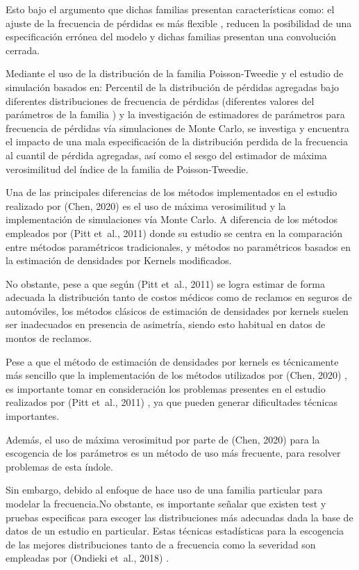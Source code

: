 \documentclass[
  letterpaper,
  onepage,
  openany]{scrreprt}
\begin{document}
Esto bajo el argumento que dichas familias presentan características
como: el ajuste de la frecuencia de pérdidas es más flexible , reducen
la posibilidad de una especificación errónea del modelo y dichas
familias presentan una convolución cerrada.

Mediante el uso de la distribución de la familia Poisson-Tweedie y el
estudio de simulación basados en: Percentil de la distribución de
pérdidas agregadas bajo diferentes distribuciones de frecuencia de
pérdidas (diferentes valores del parámetros de la familia ) y la
investigación de estimadores de parámetros para frecuencia de pérdidas
vía simulaciones de Monte Carlo, se investiga y encuentra el impacto de
una mala especificación de la distribución perdida de la frecuencia al
cuantil de pérdida agregadas, así como el sesgo del estimador de máxima
verosimilitud del índice de la familia de Poisson-Tweedie.

Una de las principales diferencias de los métodos implementados en el
estudio realizado por (Chen, 2020) es el uso de máxima verosimilitud y
la implementación de simulaciones vía Monte Carlo. A diferencia de los
métodos empleados por (Pitt et~al., 2011) donde su estudio se centra en
la comparación entre métodos paramétricos tradicionales, y métodos no
paramétricos basados en la estimación de densidades por Kernels
modificados.

No obstante, pese a que según (Pitt et~al., 2011) se logra estimar de
forma adecuada la distribución tanto de costos médicos como de reclamos
en seguros de automóviles, los métodos clásicos de estimación de
densidades por kernels suelen ser inadecuados en presencia de asimetría,
siendo esto habitual en datos de montos de reclamos.

Pese a que el método de estimación de densidades por kernels es
técnicamente más sencillo que la implementación de los métodos
utilizados por (Chen, 2020) , es importante tomar en consideración los
problemas presentes en el estudio realizados por (Pitt et~al., 2011) ,
ya que pueden generar dificultades técnicas importantes.

Además, el uso de máxima verosimitud por parte de (Chen, 2020) para la
escogencia de los parámetros es un método de uso más frecuente, para
resolver problemas de esta índole.

Sin embargo, debido al enfoque de hace uso de una familia particular
para modelar la frecuencia.No obstante, es importante señalar que
existen test y pruebas especificas para escoger las distribuciones más
adecuadas dada la base de datos de un estudio en particular. Estas
técnicas estadísticas para la escogencia de las mejores distribuciones
tanto de a frecuencia como la severidad son empleadas por (Ondieki
et~al., 2018) .
\end{document}
